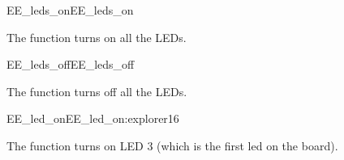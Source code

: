 \begin{function_nopb2}{EE\_leds\_on}{EE_leds_on}
  
  \begin{fundescription}
    The function turns on all the LEDs.
  \end{fundescription}
  
  
  
\end{function_nopb2}

\begin{function_nopb2}{EE\_leds\_off}{EE_leds_off}
  
  \begin{fundescription}
    The function turns off all the LEDs.
  \end{fundescription}
  
  
  
\end{function_nopb2}


\begin{function_nopb2}{EE\_led\_on}{EE_led_on:explorer16}
  
  \begin{fundescription}
    The function turns on LED 3 (which is the first led on the board).
  \end{fundescription}
  
  
  
\end{function_nopb2}

